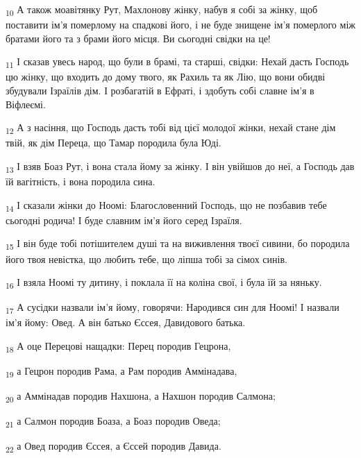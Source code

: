 \begin{tcolorbox}
\textsubscript{10} А також моавітянку Рут, Махлонову жінку, набув я собі за жінку, щоб поставити ім'я померлому на спадкові його, і не буде знищене ім'я померлого між братами його та з брами його місця. Ви сьогодні свідки на це!
\end{tcolorbox}
\begin{tcolorbox}
\textsubscript{11} І сказав увесь народ, що були в брамі, та старші, свідки: Нехай дасть Господь цю жінку, що входить до дому твого, як Рахиль та як Лію, що вони обидві збудували Ізраїлів дім. І розбагатій в Ефраті, і здобуть собі славне ім'я в Віфлеємі.
\end{tcolorbox}
\begin{tcolorbox}
\textsubscript{12} А з насіння, що Господь дасть тобі від цієї молодої жінки, нехай стане дім твій, як дім Переца, що Тамар породила була Юді.
\end{tcolorbox}
\begin{tcolorbox}
\textsubscript{13} І взяв Боаз Рут, і вона стала йому за жінку. І він увійшов до неї, а Господь дав їй вагітність, і вона породила сина.
\end{tcolorbox}
\begin{tcolorbox}
\textsubscript{14} І сказали жінки до Ноомі: Благословенний Господь, що не позбавив тебе сьогодні родича! І буде славним ім'я його серед Ізраїля.
\end{tcolorbox}
\begin{tcolorbox}
\textsubscript{15} І він буде тобі потішителем душі та на виживлення твоєї сивини, бо породила його твоя невістка, що любить тебе, що ліпша тобі за сімох синів.
\end{tcolorbox}
\begin{tcolorbox}
\textsubscript{16} І взяла Ноомі ту дитину, і поклала її на коліна свої, і була їй за няньку.
\end{tcolorbox}
\begin{tcolorbox}
\textsubscript{17} А сусідки назвали ім'я йому, говорячи: Народився син для Ноомі! І назвали ім'я йому: Овед. А він батько Єссея, Давидового батька.
\end{tcolorbox}
\begin{tcolorbox}
\textsubscript{18} А оце Перецові нащадки: Перец породив Гецрона,
\end{tcolorbox}
\begin{tcolorbox}
\textsubscript{19} а Гецрон породив Рама, а Рам породив Аммінадава,
\end{tcolorbox}
\begin{tcolorbox}
\textsubscript{20} а Аммінадав породив Нахшона, а Нахшон породив Салмона;
\end{tcolorbox}
\begin{tcolorbox}
\textsubscript{21} а Салмон породив Боаза, а Боаз породив Оведа;
\end{tcolorbox}
\begin{tcolorbox}
\textsubscript{22} а Овед породив Єссея, а Єссей породив Давида.
\end{tcolorbox}
